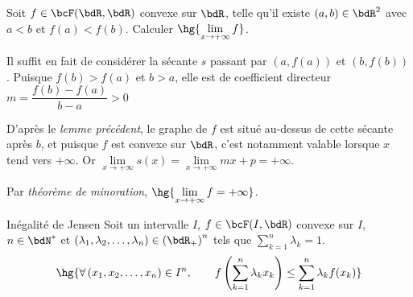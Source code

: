\documentclass[a4paper,french,bookmarks]{report}
\begin{document}
\begin{exercise}{}{}
    Soit $f \in \bcF(\bdR, \bdR)$ convexe sur $\bdR$, telle qu'il existe $(a, b) \in \bdR^2$ avec $a < b$ et $f(a) < f(b)$. Calculer $\hg{\lim\limits_{x \to +\infty} f}$.
    
    \begin{enumerate}
        \itt Il suffit en fait de considérer la sécante $s$ passant par $\left(a, f(a)\right)$ et $\left(b, f(b)\right)$. Puisque $f(b) > f(a)$ et $b > a$, elle est de coefficient directeur $m = \dfrac{f(b)-f(a)}{b-a} > 0$
        
        \itt D'après le \textit{lemme précédent}, le graphe de $f$ est situé au-dessus de cette sécante après $b$, et puisque $f$ est convexe sur $\bdR$, c'est notamment valable lorsque $x$ tend vers $+\infty$. Or $\lim\limits_{x \to +\infty} s(x) = \lim\limits_{x \to +\infty} mx + p = +\infty$.
        
        \itt Par \textit{théorème de minoration}, $\hg{\lim\limits_{x \to +\infty} f = +\infty}$.
    \end{enumerate}
\end{exercise}

\newpage

\begin{theorem}{Inégalité de Jensen}{}
    Soit un intervalle $I$, $f \in \bcF(I, \bdR)$ convexe sur $I$, $n \in \bdN^*$ et $\left(\lambda_1, \lambda_2, \dots, \lambda_n\right) \in \left(\bdR_+\right)^n$ tels que $ \sum_{k=1}^n \lambda_k = 1$.
    \[ \hg{\forall \left(x_1, x_2, \dots, x_n\right) \in I^n,\qquad f\left(\sum_{k=1}^n \lambda_kx_k\right) \leq \sum_{k=1}^n \lambda_kf(x_k)}\]
\end{theorem}
    
\end{document}
